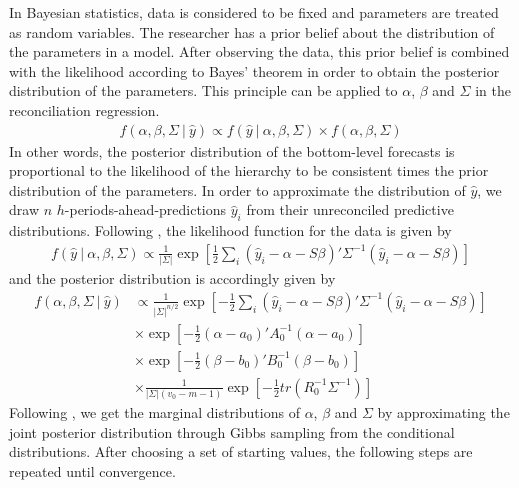 \documentclass[a4paper,fleqn,11pt]{article}
\begin{document}
In Bayesian statistics, data is considered to be fixed and parameters are treated as random variables. The researcher has a prior belief about the distribution of the parameters in a model. After observing the data, this prior belief is combined with the likelihood according to Bayes' theorem in order to obtain the posterior distribution of the parameters. This principle can be applied to $\alpha$, $\beta$ and $\Sigma$ in the reconciliation regression.
\begin{align}
	f(\alpha, \beta, \Sigma\ |\ \hat{y}) \propto f(\hat{y}\ |\ \alpha, \beta, \Sigma) \times f(\alpha, \beta, \Sigma)
\end{align}
In other words, the posterior distribution of the bottom-level forecasts is proportional to the likelihood of the hierarchy to be consistent times the prior distribution of the parameters. In order to approximate the distribution of $\hat{y}$, we draw $n$ $h$-periods-ahead-predictions $\hat{y}_i$ from their unreconciled predictive distributions. Following \cite{Greenberg2008}, the likelihood function for the data is given by 
\begin{align*}
f(\hat{y}\ |\ \alpha,\beta,\Sigma) \propto \frac{1}{|\Sigma|}\exp\left[\frac{1}{2} \sum_i (\hat{y}_i - \alpha - S\beta)'\Sigma^{-1}(\hat{y}_i - \alpha - S\beta)\right]
\end{align*}
and the posterior distribution is accordingly given by
\begin{align*}
f(\alpha,\beta,\Sigma\ |\ \hat{y}) & \propto \frac{1}{|\Sigma|^{n/2}}\exp\left[-\frac{1}{2} \sum_i (\hat{y}_i - \alpha - S\beta)'\Sigma^{-1}(\hat{y}_i - \alpha - S\beta)\right] \\
&\times \exp \left[-\frac{1}{2}(\alpha - a_0)'A_0^{-1}(\alpha - a_0)\right] \\
&\times \exp \left[-\frac{1}{2}(\beta - b_0)'B_0^{-1}(\beta - b_0)\right] \\
&\times \frac{1}{|\Sigma|(v_0 - m - 1)} \exp \left[-\frac{1}{2} tr(R_0^{-1}\Sigma^{-1}) \right]
\end{align*}
Following \cite{Percy1992}, we get the marginal distributions of $\alpha$, $\beta$ and $\Sigma$ by approximating the joint posterior distribution through Gibbs sampling from the conditional distributions. After choosing a set of starting values, the following steps are repeated until convergence.
\end{document}
